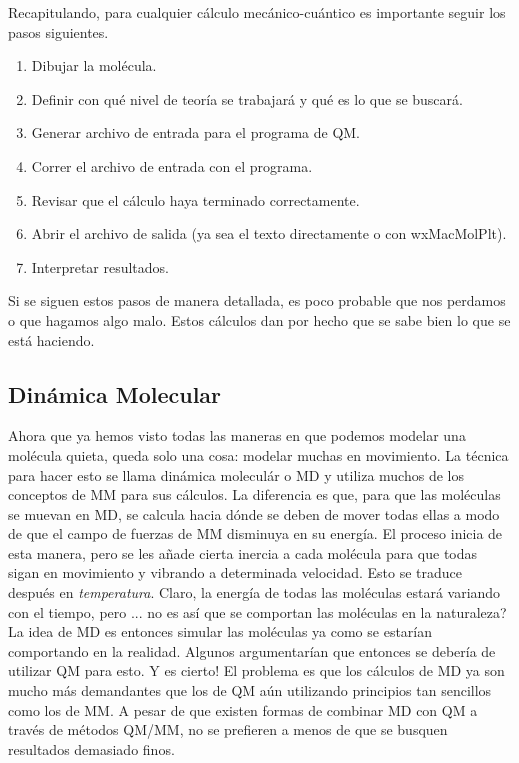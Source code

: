 \documentclass[10pt,letterpaper]{article}
\begin{document}
Recapitulando, para cualquier c\'alculo mec\'anico-cu\'antico es importante seguir los pasos siguientes.

\begin{enumerate}
\item Dibujar la mol\'ecula.
\item Definir con qu\'e nivel de teor\'ia se trabajar\'a y qu\'e es lo que se buscar\'a.
\item Generar archivo de entrada para el programa de QM.
\item Correr el archivo de entrada con el programa.
\item Revisar que el c\'alculo haya terminado correctamente.
\item Abrir el archivo de salida (ya sea el texto directamente o con wxMacMolPlt).
\item Interpretar resultados.
\end{enumerate}

Si se siguen estos pasos de manera detallada, es poco probable que nos perdamos o que hagamos algo malo. Estos c\'alculos dan por hecho que se sabe bien lo que se est\'a haciendo.

\subsection{Din\'amica Molecular}
Ahora que ya hemos visto todas las maneras en que podemos modelar una mol\'ecula quieta, queda solo una cosa: modelar muchas en movimiento. La t\'ecnica para hacer esto se llama din\'amica molecul\'ar o MD y utiliza muchos de los conceptos de MM para sus c\'alculos. La diferencia es que, para que las mol\'eculas se muevan en MD, se calcula hacia d\'onde se deben de mover todas ellas a modo de que el campo de fuerzas de MM disminuya en su energ\'ia. El proceso inicia de esta manera, pero se les a\~nade cierta inercia a cada mol\'ecula para que todas sigan en movimiento y vibrando a determinada velocidad. Esto se traduce despu\'es en \emph{temperatura}. Claro, la energ\'ia de todas las mol\'eculas estar\'a variando con el tiempo, pero ... no es as\'i que se comportan las mol\'eculas en la naturaleza?\\

La idea de MD es entonces simular las mol\'eculas ya como se estar\'ian comportando en la realidad. Algunos argumentar\'ian que entonces se deber\'ia de utilizar QM para esto. Y es cierto! El problema es que los c\'alculos de MD ya son mucho m\'as demandantes que los de QM a\'un utilizando principios tan sencillos como los de MM. A pesar de que existen formas de combinar MD con QM a trav\'es de m\'etodos QM/MM, no se prefieren a menos de que se busquen resultados demasiado finos.\\
\end{document}
